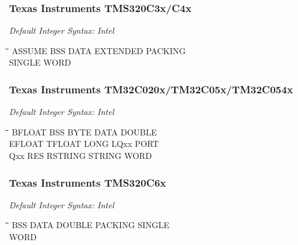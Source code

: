 \subsubsection{Texas Instruments TMS320C3x/C4x}

{\em Default Integer Syntax: Intel}

{\tt\begin{tabbing}
\hspace{3cm}\=\hspace{3cm}\=\hspace{3cm}\=\hspace{3cm}\=\kill
ASSUME     \> BSS         \> DATA        \> EXTENDED    \> PACKING \\
SINGLE     \> WORD \\
\end{tabbing}}

\subsubsection{Texas Instruments TM32C020x/TM32C05x/TM32C054x}

{\em Default Integer Syntax: Intel}

{\tt\begin{tabbing}
\hspace{3cm}\=\hspace{3cm}\=\hspace{3cm}\=\hspace{3cm}\=\kill
BFLOAT     \> BSS         \> BYTE        \> DATA        \> DOUBLE \\
EFLOAT     \> TFLOAT      \> LONG        \> LQxx        \> PORT \\
Qxx        \> RES         \> RSTRING     \> STRING      \> WORD \\
\end{tabbing}}

\subsubsection{Texas Instruments TMS320C6x}

{\em Default Integer Syntax: Intel}

{\tt\begin{tabbing}
\hspace{3cm}\=\hspace{3cm}\=\hspace{3cm}\=\hspace{3cm}\=\kill
BSS         \> DATA        \> DOUBLE     \> PACKING     \> SINGLE \\
WORD \\
\end{tabbing}}

